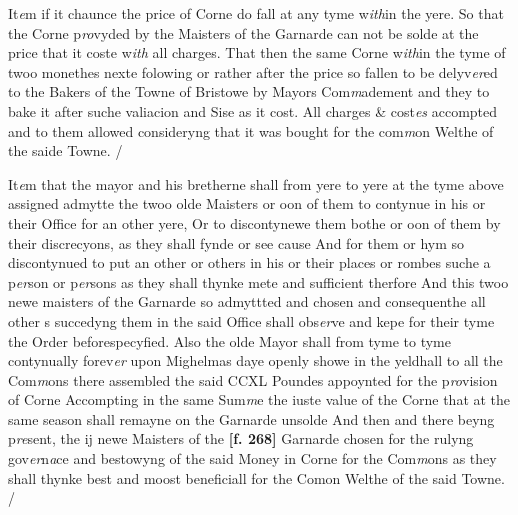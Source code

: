 \documentclass[a4paper,12pt]{article}
\begin{document}
It\textit{e}m if it chaunce the price of Corne do fall at any tyme w\textit{ith}in the yere. So that the Corne p\textit{ro}vyded by the Maisters of the Garnarde can not be solde at the price that it coste w\textit{ith} all charges. That then the same Corne w\textit{ith}in the tyme of twoo monethes nexte folowing or rather after the price so fallen to be delyv\textit{er}ed to the Bakers of the Towne of Bristowe by Mayors Com\textit{m}adement and they to bake it after suche valiacion and Sise as it cost. All charges \& cost\textit{es} accompted and to them allowed consideryng that it was bought for the com\textit{m}on Welthe of the saide Towne. /

It\textit{e}m that the mayor and his bretherne shall from yere to yere at the tyme above assigned admytte the twoo olde Maisters or oon of them to contynue in his or their Office for an other yere, Or to discontynewe them bothe or oon of them by their discrecyons, as they shall fynde or see cause And for them or hym so discontynued to put an other or others in his or their places or rombes suche a p\textit{er}son or p\textit{er}sons as they shall thynke mete and sufficient therfore And this twoo newe maisters of the Garnarde so admyttted and chosen and consequenthe all other s succedyng them in the said Office shall obs\textit{er}ve and kepe for their tyme the Order beforespecyfied. Also the olde Mayor shall from tyme to tyme contynually forev\textit{er} upon Mighelmas daye openly showe in the yeldhall to all the Com\textit{m}ons there assembled the said CCXL Poundes appoynted for the p\textit{ro}vision of Corne Accompting in the same Sum\textit{m}e the iuste value of the Corne that at the same season shall remayne on the Garnarde unsolde And then and there beyng p\textit{re}sent, the ij newe Maisters of the \textbf{[f. 268]} Garnarde chosen for the rulyng gov\textit{er}n\textit{a}ce and bestowyng of the said Money in Corne for the Com\textit{m}ons as they shall thynke best and moost beneficiall for the Comon Welthe of the said Towne. /
\end{document}
